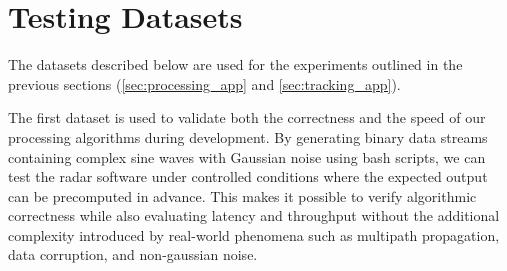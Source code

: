 
\section{Testing Datasets}
The datasets described below are used for the experiments outlined in the previous sections 
(\ref{sec:processing_app} and \ref{sec:tracking_app}).

The first dataset is used 
to validate both the correctness and the speed of our processing algorithms during development. 
By generating binary data streams containing complex sine waves with Gaussian noise using bash scripts, 
we can test the radar software under controlled conditions where the expected output can be precomputed 
in advance. This makes it possible to verify algorithmic correctness while also evaluating latency and 
throughput without the additional complexity introduced by real-world phenomena such as multipath 
propagation, data corruption, and non-gaussian noise. 

